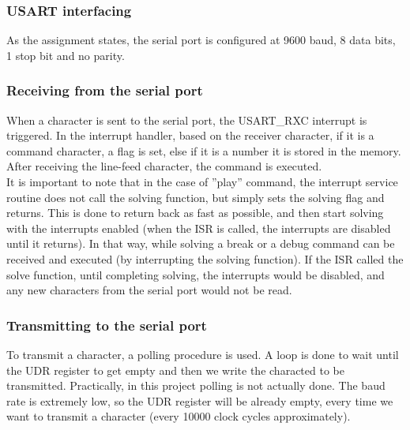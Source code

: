 \documentclass[12pt, a4]{article}
\begin{document}
\subsubsection*{USART interfacing}
As the assignment states, the serial port is configured at 9600 baud, 8 data bits, 1 stop bit and no parity.
\subsubsection*{Receiving from the serial port}
When a character is sent to the serial port, the USART\_RXC interrupt is triggered. In the interrupt handler, based on the receiver character, if it is a command character, a flag is set, else if it is a number it is stored in the memory. After receiving the line-feed character, the command is executed. \\
It is important to note that in the case of ''play'' command, the interrupt service routine does not call the solving function, but simply sets the solving flag and returns. This is done to return back as fast as possible, and then start solving with the interrupts enabled (when the ISR is called, the interrupts are disabled until it returns). In that way, while solving a break or a debug command can be received and executed (by interrupting the solving function). If the ISR called the solve function, until completing solving, the interrupts would be disabled, and any new characters from the serial port would not be read.

\subsubsection*{Transmitting to the serial port}
To transmit a character, a polling procedure is used. A loop is done to wait until the UDR register to get empty and then we write the characted to be transmitted. Practically, in this project polling is not actually done. The baud rate is extremely low, so the UDR register will be already empty, every time we want to transmit a character (every 10000 clock cycles approximately).
\end{document}
